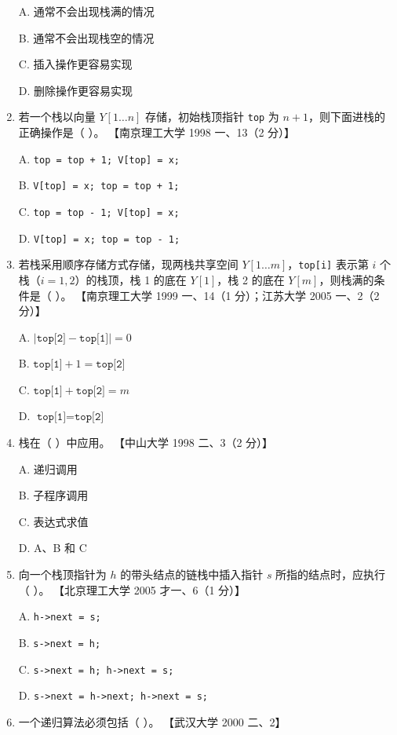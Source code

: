 \documentclass[lang=cn,newtx,10pt,scheme=chinese]{../../elegantbook}
\begin{document}
\begin{enumerate}
    A. 通常不会出现栈满的情况  

    B. 通常不会出现栈空的情况 

    C. 插入操作更容易实现  

    D. 删除操作更容易实现  

    \item 若一个栈以向量 $Y[1 \ldots n]$ 存储，初始栈顶指针 \texttt{top} 为 $n+1$，则下面进栈的正确操作是（ ）。  
    【南京理工大学 1998 一、13（2 分）】  

    A. \texttt{top = top + 1; V[top] = x;}  

    B. \texttt{V[top] = x; top = top + 1;}  

    C. \texttt{top = top - 1; V[top] = x;}  

    D. \texttt{V[top] = x; top = top - 1;}  

    \item 若栈采用顺序存储方式存储，现两栈共享空间 $Y[1 \ldots m]$，\texttt{top[i]} 表示第 $i$ 个栈（$i=1, 2$）的栈顶，栈 1 的底在 $Y[1]$，栈 2 的底在 $Y[m]$，则栈满的条件是（ ）。  
    【南京理工大学 1999 一、14（1 分）；江苏大学 2005 一、2（2 分）】  

    A. $| \texttt{top[2]} - \texttt{top[1]} | = 0$  

    B. $\texttt{top[1]} + 1 = \texttt{top[2]}$  

    C. $\texttt{top[1]} + \texttt{top[2]} = m$  

    D. $\texttt{top[1]} = \texttt{top[2]}$  

    \item 栈在（ ）中应用。  
    【中山大学 1998 二、3（2 分）】  

    A. 递归调用  

    B. 子程序调用  

    C. 表达式求值  

    D. A、B 和 C  

    \item 向一个栈顶指针为 $h$ 的带头结点的链栈中插入指针 $s$ 所指的结点时，应执行（ ）。  
    【北京理工大学 2005 才一、6（1 分）】  

    A. \texttt{h->next = s;}  
    
    B. \texttt{s->next = h;}  

    C. \texttt{s->next = h; h->next = s;}  

    D. \texttt{s->next = h->next; h->next = s;}  

    \item 一个递归算法必须包括（ ）。  
    【武汉大学 2000 二、2】  


\end{enumerate}
\end{document}
